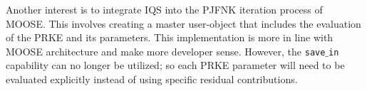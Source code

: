 \documentclass[11pt]{scrartcl}
\begin{document}
Another interest is to integrate IQS into the PJFNK iteration process of MOOSE. This involves creating a master user-object that includes the evaluation of the PRKE and its parameters.  This implementation is more in line with MOOSE architecture and make more developer sense. However, the \texttt{save$\_$in} capability can no longer be utilized; so each PRKE parameter will need to be evaluated explicitly instead of using specific residual contributions.



\end{document}
